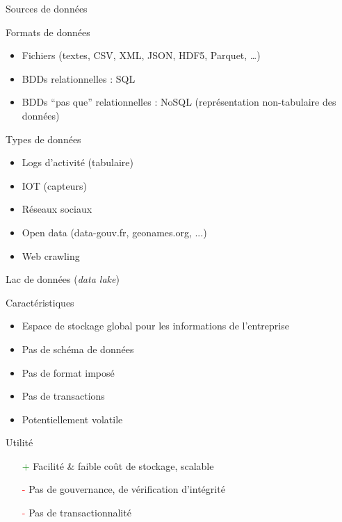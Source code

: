 \begin{frame}{Sources de données}
\end{frame}

\begin{frame}{Formats de données}
  \begin{itemize}
    \item Fichiers (textes, CSV, XML, JSON, HDF5, Parquet, …)
    \item BDDs relationnelles : SQL
    \item BDDs ``pas que'' relationnelles : NoSQL (représentation non-tabulaire des données)
  \end{itemize}
\end{frame}

\begin{frame}{Types de données}
  \begin{itemize}
    \item Logs d'activité (tabulaire)
    \item IOT (capteurs)
    \item Réseaux sociaux
    \item Open data (data-gouv.fr, geonames.org, ...)
    \item Web crawling 
  \end{itemize}
\end{frame}

\begin{frame}{Lac de données (\textit{data lake})}

  Caractéristiques

  \begin{itemize}
    \item Espace de stockage global pour les informations de l'entreprise
    \item Pas de schéma de données
    \item Pas de format imposé
    \item Pas de transactions
    \item Potentiellement volatile
  \end{itemize}

  Utilité

  \begin{itemize}
    \item[\textcolor{green}{+}] Facilité \& faible coût de stockage, scalable
    \item[\textcolor{red}{-}] Pas de gouvernance, de vérification d'intégrité
    \item[\textcolor{red}{-}] Pas de transactionnalité
  \end{itemize}
\end{frame}

